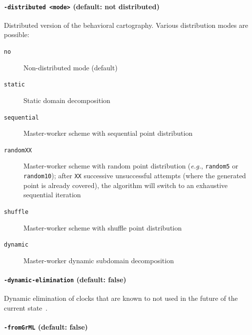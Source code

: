 \documentclass[a4paper,11pt]{report}
\makeatletter
\newcommand{\styleOption}[1]{\textcolor{optioncolor}{\texttt{#1}}}
\newcommand{\eg}{\textcolor{colorok}{\textit{e.g.},\@}}
\makeatother
\begin{document}
\paragraph{\styleOption{-distributed <mode>} (default: not distributed)}
Distributed version of the behavioral cartography.
Various distribution modes are possible:

\begin{description}
	\item[\styleOption{no}] Non-distributed mode (default)
	\item[\styleOption{static}] Static domain decomposition \cite{ACN15}
	\item[\styleOption{sequential}] Master-worker scheme with sequential point distribution \cite{ACE14}
	\item[\styleOption{randomXX}] Master-worker scheme with random point distribution (\eg{} \styleOption{random5} or \styleOption{random10}); after \styleOption{XX} successive unsuccessful attempts (where the generated point is already covered), the algorithm will switch to an exhaustive sequential iteration \cite{ACE14}
	\item[\styleOption{shuffle}] Master-worker scheme with shuffle point distribution \cite{ACN15}
	\item[\styleOption{dynamic}] Master-worker dynamic subdomain decomposition \cite{ACN15}
\end{description}




\paragraph{\styleOption{-dynamic-elimination} (default: false)}
Dynamic elimination of clocks that are known to not used in the future of the current state~\cite{Andre13FSFMA}.




\paragraph{\styleOption{-fromGrML} (default: false)}
\end{document}
